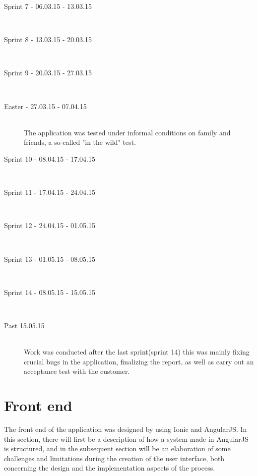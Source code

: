 \begin{description}
	\item[Sprint 7 - 06.03.15 - 13.03.15] \hfill \\ 
	
	\item[Sprint 8 - 13.03.15 - 20.03.15] \hfill \\ 

	\item[Sprint 9 - 20.03.15 - 27.03.15] \hfill \\ 
	
	\item[Easter - 27.03.15 - 07.04.15] \hfill \\ 
	The application was tested under informal conditions on family and friends, a so-called "in the wild" test.
	\item[Sprint 10 - 08.04.15 - 17.04.15] \hfill \\ 

	\item[Sprint 11 - 17.04.15 - 24.04.15] \hfill \\ 

	\item[Sprint 12 - 24.04.15 - 01.05.15] \hfill \\ 
	
	\item[Sprint 13 - 01.05.15 - 08.05.15] \hfill \\ 

	\item[Sprint 14 - 08.05.15 - 15.05.15] \hfill \\ 
	
	\item[Past 15.05.15] \hfill \\ 
	Work was conducted after the last sprint(sprint 14) this was mainly fixing crucial bugs in the application, finalizing the report, as well as carry out an acceptance test  with the customer.
	
\end{description}


\section{Front end}

The front end of the application was designed by using Ionic and AngularJS. In this section, there will first be a description of how a system made in AngularJS is structured, and in the subsequent section will be an elaboration of some challenges and limitations during the creation of the user interface, both concerning the design and the implementation aspects of the process.

